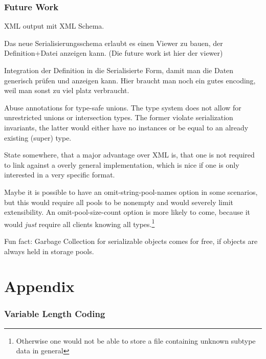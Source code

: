 \documentclass[a4paper,10pt]{article}
\begin{document}

\section{Future Work}

XML output mit XML Schema.

Das neue Serialisierungsschema erlaubt es einen Viewer zu bauen, der Definition+Datei anzeigen kann. (Die future work ist hier der viewer)

Integration der Definition in die Serialisierte Form, damit man die Daten generisch prüfen und anzeigen kann. Hier braucht man noch ein gutes encoding, weil man sonst zu viel platz verbraucht.

Abuse annotations for type-safe unions. The type system does not allow for unrestricted unions or intersection types. The former violate serialization invariants, the latter would either have no instances or be equal to an already existing (super) type.

State somewhere, that a major advantage over XML is, that one is not required to link against a overly general implementation, which is nice if one is only interested in a very specific format.

Maybe it is possible to have an omit-string-pool-names option in some scenarios, but this would require all pools to be nonempty and would severely limit extensibility. An omit-pool-size-count option is more likely to come, because it would \textit{just} require all clients knowing all types.\footnote{Otherwise one would not be able to store a file containing unknown subtype data in general}

Fun fact: Garbage Collection for serializable objects comes for free, if objects are always held in storage pools.

\newpage
\todos

\part{Appendix}
\renewcommand\thesection{\Alph{section}}
\setcounter{section}{0}
\section{Variable Length Coding}
\end{document}
